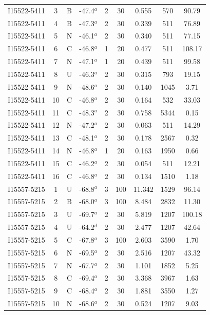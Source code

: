 \begin{table}
\begin{tabular}{ccccccccc}
I15522-5411 & 3 & B & -47.4$^{a}$ & 2 & 30 & 0.555 & 570 & 90.79 \\
I15522-5411 & 4 & B & -47.3$^{a}$ & 2 & 30 & 0.339 & 511 & 76.89 \\
I15522-5411 & 5 & N & -46.1$^{a}$ & 2 & 30 & 0.340 & 511 & 77.15 \\
I15522-5411 & 6 & C & -46.8$^{a}$ & 1 & 20 & 0.477 & 511 & 108.17 \\
I15522-5411 & 7 & N & -47.1$^{a}$ & 1 & 20 & 0.439 & 511 & 99.58 \\
I15522-5411 & 8 & U & -46.3$^{a}$ & 2 & 30 & 0.315 & 793 & 19.15 \\
I15522-5411 & 9 & N & -48.6$^{a}$ & 2 & 30 & 0.140 & 1045 & 3.71 \\
I15522-5411 & 10 & C & -46.8$^{a}$ & 2 & 30 & 0.164 & 532 & 33.03 \\
I15522-5411 & 11 & C & -48.3$^{a}$ & 2 & 30 & 0.758 & 5344 & 0.15 \\
I15522-5411 & 12 & N & -47.2$^{a}$ & 2 & 30 & 0.063 & 511 & 14.29 \\
I15522-5411 & 13 & C & -48.1$^{a}$ & 2 & 30 & 0.178 & 2567 & 0.32 \\
I15522-5411 & 14 & N & -46.8$^{a}$ & 1 & 20 & 0.163 & 1950 & 0.66 \\
I15522-5411 & 15 & C & -46.2$^{a}$ & 2 & 30 & 0.054 & 511 & 12.21 \\
I15522-5411 & 16 & C & -46.8$^{a}$ & 2 & 30 & 0.134 & 1510 & 1.18 \\
I15557-5215 & 1 & U & -68.8$^{a}$ & 3 & 100 & 11.342 & 1529 & 96.14 \\
I15557-5215 & 2 & B & -68.0$^{a}$ & 3 & 100 & 8.484 & 2832 & 11.30 \\
I15557-5215 & 3 & U & -69.7$^{a}$ & 2 & 30 & 5.819 & 1207 & 100.18 \\
I15557-5215 & 4 & U & -64.2$^{d}$ & 2 & 30 & 2.477 & 1207 & 42.64 \\
I15557-5215 & 5 & C & -67.8$^{a}$ & 3 & 100 & 2.603 & 3590 & 1.70 \\
I15557-5215 & 6 & N & -69.5$^{a}$ & 2 & 30 & 2.516 & 1207 & 43.32 \\
I15557-5215 & 7 & N & -67.7$^{a}$ & 2 & 30 & 1.101 & 1852 & 5.25 \\
I15557-5215 & 8 & C & -69.4$^{a}$ & 2 & 30 & 3.368 & 3967 & 1.63 \\
I15557-5215 & 9 & C & -68.4$^{a}$ & 2 & 30 & 1.881 & 3550 & 1.27 \\
I15557-5215 & 10 & N & -68.6$^{a}$ & 2 & 30 & 0.524 & 1207 & 9.03 \\

\end{tabular}
\end{table}
